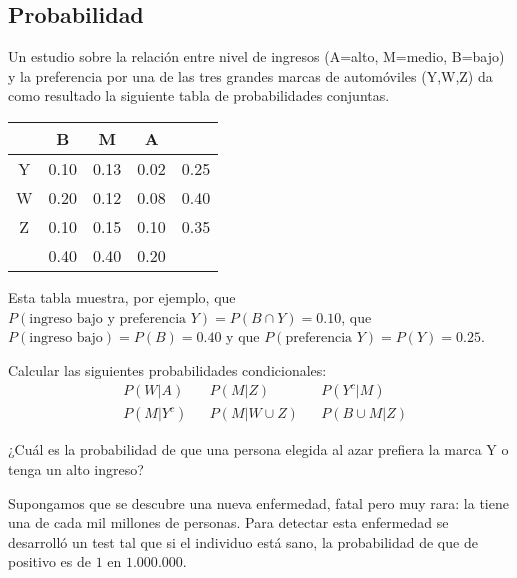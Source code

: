 \documentclass[a4paper,oneside,fleqn,11pt]{article}
\begin{document}
\maketitle

\begin{ejercicios}

\section{Probabilidad}

\item 
Un estudio sobre la relación entre nivel de ingresos (A=alto, M=medio, B=bajo) y
la preferencia por una de las tres grandes marcas de automóviles (Y,W,Z) da como
resultado la siguiente tabla de probabilidades conjuntas.

\begin{table}[h]
    \centering
    \begin{tabular}{c|ccc|c}
         & B & M & A \\
        \hline
        Y & 0.10 & 0.13 & 0.02 & 0.25 \\
        W & 0.20 & 0.12 & 0.08 & 0.40 \\
        Z & 0.10 & 0.15 & 0.10 & 0.35 \\
        \hline
         & 0.40 & 0.40 & 0.20 \\
    \end{tabular}
\end{table}

\noindent 
Esta tabla muestra, por ejemplo, que $P(\text{ingreso bajo y preferencia } Y) =
P(B \cap Y) = 0.10$, que $P(\text{ingreso bajo}) = P(B) = 0.40$ y que
$P(\text{preferencia } Y) = P(Y) = 0.25$.

\begin{ejitems}
  \item
  Calcular las siguientes probabilidades condicionales:
  \begin{align*}
    & P(W|A)
    && P(M|Z)
    && P(Y^c|M)
    \\
    & P(M|Y^c)
    && P(M|W \cup Z)
    && P(B \cup M|Z)
  \end{align*}
  
  \item
  ¿Cuál es la probabilidad de que una persona elegida al azar prefiera la marca Y
  o tenga un alto ingreso?
\end{ejitems}

\item
Supongamos que se descubre una nueva enfermedad, fatal pero muy rara: la tiene
una de cada mil millones de personas. Para detectar esta enfermedad se
desarrolló un test tal que si el individuo está sano, la probabilidad de que
de positivo es de $1$ en $1.000.000$.


\end{ejercicios}
\end{document}
